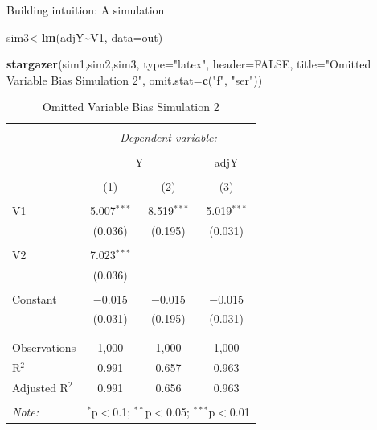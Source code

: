 \documentclass[
  ignorenonframetext,
]{beamer}
\newenvironment{Shaded}{\begin{snugshade}}{\end{snugshade}}
\newcommand{\DataTypeTok}[1]{\textcolor[rgb]{0.13,0.29,0.53}{#1}}
\newcommand{\KeywordTok}[1]{\textcolor[rgb]{0.13,0.29,0.53}{\textbf{#1}}}
\newcommand{\NormalTok}[1]{#1}
\newcommand{\OperatorTok}[1]{\textcolor[rgb]{0.81,0.36,0.00}{\textbf{#1}}}
\newcommand{\OtherTok}[1]{\textcolor[rgb]{0.56,0.35,0.01}{#1}}
\newcommand{\StringTok}[1]{\textcolor[rgb]{0.31,0.60,0.02}{#1}}
\begin{document}
\begin{frame}[fragile]{Building intuition: A simulation}
\protect\hypertarget{building-intuition-a-simulation-5}{}
\tiny

\begin{Shaded}
\begin{Highlighting}[]
\NormalTok{sim3\textless{}{-}}\KeywordTok{lm}\NormalTok{(adjY}\OperatorTok{\textasciitilde{}}\NormalTok{V1, }\DataTypeTok{data=}\NormalTok{out)}

\KeywordTok{stargazer}\NormalTok{(sim1,sim2,sim3, }\DataTypeTok{type=}\StringTok{"latex"}\NormalTok{, }\DataTypeTok{header=}\OtherTok{FALSE}\NormalTok{, }
          \DataTypeTok{title=}\StringTok{"Omitted Variable Bias Simulation 2"}\NormalTok{, }\DataTypeTok{omit.stat=}\KeywordTok{c}\NormalTok{(}\StringTok{"f"}\NormalTok{, }\StringTok{"ser"}\NormalTok{))}
\end{Highlighting}
\end{Shaded}

\begin{table}[!htbp] \centering 
  \caption{Omitted Variable Bias Simulation 2} 
  \label{} 
\begin{tabular}{@{\extracolsep{5pt}}lccc} 
\\[-1.8ex]\hline 
\hline \\[-1.8ex] 
 & \multicolumn{3}{c}{\textit{Dependent variable:}} \\ 
\cline{2-4} 
\\[-1.8ex] & \multicolumn{2}{c}{Y} & adjY \\ 
\\[-1.8ex] & (1) & (2) & (3)\\ 
\hline \\[-1.8ex] 
 V1 & 5.007$^{***}$ & 8.519$^{***}$ & 5.019$^{***}$ \\ 
  & (0.036) & (0.195) & (0.031) \\ 
  & & & \\ 
 V2 & 7.023$^{***}$ &  &  \\ 
  & (0.036) &  &  \\ 
  & & & \\ 
 Constant & $-$0.015 & $-$0.015 & $-$0.015 \\ 
  & (0.031) & (0.195) & (0.031) \\ 
  & & & \\ 
\hline \\[-1.8ex] 
Observations & 1,000 & 1,000 & 1,000 \\ 
R$^{2}$ & 0.991 & 0.657 & 0.963 \\ 
Adjusted R$^{2}$ & 0.991 & 0.656 & 0.963 \\ 
\hline 
\hline \\[-1.8ex] 
\textit{Note:}  & \multicolumn{3}{r}{$^{*}$p$<$0.1; $^{**}$p$<$0.05; $^{***}$p$<$0.01} \\ 
\end{tabular} 
\end{table} 
\normalsize
\end{frame}
\end{document}
